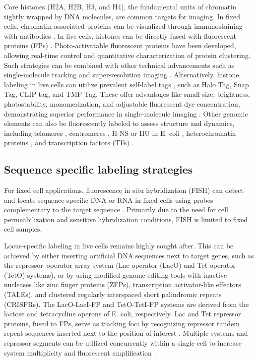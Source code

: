 Core histones (H2A, H2B, H3, and H4), the fundamental units of chromatin tightly wrapped by DNA molecules, are common targets for imaging. In fixed cells, chromatin-associated proteins can be visualized through immunostaining with antibodies \parencite{Conic2018,Ricci2015,Xu2018}. In live cells, histones can be directly fused with fluorescent proteins (FPs) \parencite{Belmont2001,Das2003,Kanda1998}. Photo-activatable fluorescent proteins have been developed, allowing real-time control and quantitative characterization of protein clustering. Such strategies can be combined with other technical advancements such as single-molecule tracking and super-resolution imaging \parencite{Cisse2013,Manley2008,Nozaki2017}. Alternatively, histone labeling in live cells can utilize prevalent self-label tags \parencite{Liss2015,Stagge2013}, such as Halo Tag, Snap Tag, CLIP tag, and TMP Tag. These offer advantages like small size, brightness, photostability, monomerization, and adjustable fluorescent dye concentration, demonstrating superior performance in single-molecule imaging \parencite{Grimm2017,Nagashima2019,Nozaki2017}. Other genomic elements can also be fluorescently labeled to assess structure and dynamics, including telomeres \parencite{Avogaro2018}, centromeres \parencite{Avogaro2018,Gasser2002}, H-NS or HU in E. coli \parencite{Wang2011}, heterochromatin proteins \parencite{Hu2013}, and transcription factors (TFs) \parencite{Elf2007,Gebhardt2013}.

\subsection{Sequence specific labeling strategies}

For fixed cell applications, fluorescence in situ hybridization (FISH) can detect and locate sequence-specific DNA or RNA in fixed cells using probes complementary to the target sequence \parencite{Bayani2004,Beliveau2015}. Primarily due to the need for cell permeabilization and sensitive hybridization conditions, FISH is limited to fixed cell samples.

Locus-specific labeling in live cells remains highly sought after. This can be achieved by either inserting artificial DNA sequences next to target genes, such as the repressor–operator array system (Lac operator (LacO) and Tet operator (TetO) systems), or by using modified genome-editing tools with inactive nucleases like zinc finger proteins (ZFPs), transcription activator-like effectors (TALEs), and clustered regularly interspaced short palindromic repeats (CRISPRs). The LacO-LacI-FP and TetO-TetI-FP systems are derived from the lactose and tetracycline operons of E. coli, respectively. Lac and Tet repressor proteins, fused to FPs, serve as tracking foci by recognizing repressor tandem repeat sequences inserted next to the position of interest \parencite{Ding2017,Loiodice2014}. Multiple systems and repressor segments can be utilized concurrently within a single cell to increase system multiplicity and fluorescent amplification \parencite{Backlund2014,Roukos2013,Tasan2018}.

